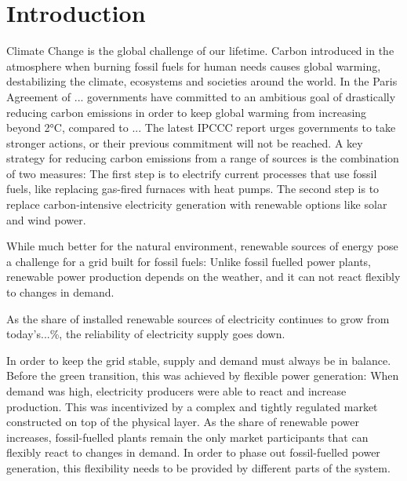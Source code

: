 
\chapter{Introduction}\label{Introduction}

Climate Change is the global challenge of our lifetime. Carbon introduced in the atmosphere when burning fossil fuels for human needs causes global warming, destabilizing the climate, ecosystems and societies around the world.
In the Paris Agreement of ... governments have committed to an ambitious goal of drastically reducing carbon emissions in order to keep global warming from increasing beyond 2°C, compared to ...
The latest IPCCC report urges governments to take stronger actions, or their previous commitment will not be reached.
A key strategy for reducing carbon emissions from a range of sources is the combination of two measures: The first step is to electrify current processes that use fossil fuels, like replacing gas-fired furnaces with heat pumps. The second step is to replace carbon-intensive electricity generation with renewable options like solar and wind power.

While much better for the natural environment, renewable sources of energy pose a challenge for a grid built for fossil fuels: Unlike fossil fuelled power plants, renewable power production depends on the weather, and it can not react flexibly to changes in demand.

As the share of installed renewable sources of electricity continues to grow from today's...\%, the reliability of electricity supply goes down.


In order to keep the grid stable, supply and demand must always be in balance. Before the green transition, this was achieved by flexible power generation: When demand was high, electricity producers were able to react and increase production.
This was incentivized by a complex and tightly regulated market constructed on top of the physical layer.
As the share of renewable power increases, fossil-fuelled plants remain the only market participants that can flexibly react to changes in demand.
In order to phase out fossil-fuelled power generation, this flexibility needs to be provided by different parts of the system.

